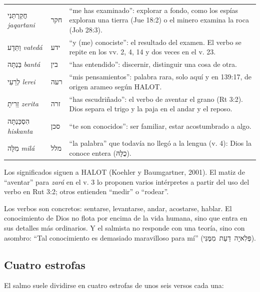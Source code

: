 \documentclass[11pt,letterpaper]{article}
\newcommand{\heb}[1]{\mbox{\foreignlanguage{hebrew}{#1}}}
\begin{document}
\begin{filologia}[Sal 139:1--4]
\begin{tabular}{@{}L{3.2cm}L{1.6cm}L{10cm}@{}}
\heb{חֲקַרְתַּנִי} \emph{jaqartani} & \heb{חקר} & ``me has examinado'': explorar a fondo, como los espías exploran una tierra (Jue 18:2) o el minero examina la roca (Job 28:3). \\[2pt]
\heb{וַתֵּדָע} \emph{vatedá} & \heb{ידע} & ``y (me) conociste'': el resultado del examen. El verbo se repite en los vv. 2, 4, 14 y dos veces en el v. 23. \\[2pt]
\heb{בַּנְתָּה} \emph{bantá} & \heb{בין} & ``has entendido'': discernir, distinguir una cosa de otra. \\[2pt]
\heb{לְרֵעִי} \emph{lerei} & \heb{רעה} & ``mis pensamientos'': palabra rara, solo aquí y en 139:17, de origen arameo según HALOT. \\[2pt]
\heb{זֵרִיתָ} \emph{zerita} & \heb{זרה} & ``has escudriñado'': el verbo de aventar el grano (Rt 3:2). Dios separa el trigo y la paja en el andar y el reposo. \\[2pt]
\heb{הִסְכַּנְתָּה} \emph{hiskanta} & \heb{סכן} & ``te son conocidos'': ser familiar, estar acostumbrado a algo. \\[2pt]
\heb{מִלָּה} \emph{milá} & \heb{מלל} & ``la palabra'' que todavía no llegó a la lengua (v. 4): Dios la conoce entera (\heb{כֻלָּהּ}). \\
\end{tabular}
\end{filologia}

\begin{nota}[Precisión]
Los significados siguen a HALOT (Koehler y Baumgartner, 2001). El matiz de ``aventar'' para \emph{zará} en el v. 3 lo proponen varios intérpretes a partir del uso del verbo en Rut 3:2; otros entienden ``medir'' o ``rodear''.
\end{nota}

Los verbos son concretos: sentarse, levantarse, andar, acostarse, hablar. El conocimiento de Dios no flota por encima de la vida humana, sino que entra en sus detalles más ordinarios. Y el salmista no responde con una teoría, sino con asombro: ``Tal conocimiento es demasiado maravilloso para mí'' (\heb{פְּלִאיָה דַעַת מִמֶּנִּי}).

\subsection{Cuatro estrofas}
El salmo suele dividirse en cuatro estrofas de unos seis versos cada una:
\end{document}
